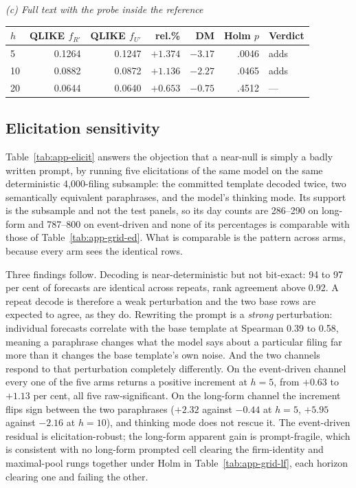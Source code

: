\begin{table}[htbp]
\vspace{1.2ex}
\emph{(c) Full text with the probe inside the reference}\\[0.4ex]
\begin{tabular}{@{}lrrrrrl@{}}
\toprule
$h$ & QLIKE $f_{R'}$ & QLIKE $f_{U'}$ & rel.\% & DM & Holm $p$ & Verdict \\
\midrule
 5 & 0.1264 & 0.1247 & $+1.374$ & $-3.17$ & .0046 & adds \\
10 & 0.0882 & 0.0872 & $+1.136$ & $-2.27$ & .0465 & adds \\
20 & 0.0644 & 0.0640 & $+0.653$ & $-0.75$ & .4512 & --- \\
\bottomrule
\end{tabular}
\end{table}

\subsection{Elicitation sensitivity}

Table~\ref{tab:app-elicit} answers the objection that a near-null is
simply a badly written prompt, by running five elicitations of the same
model on the same deterministic 4{,}000-filing subsample: the committed
template decoded twice, two semantically equivalent paraphrases, and the
model's thinking mode. Its support is the subsample and not the test
panels, so its day counts are 286--290 on long-form and 787--800 on
event-driven and none of its percentages is comparable with those of
Table~\ref{tab:app-grid-ed}. What is comparable is the pattern across arms,
because every arm sees the identical rows.

Three findings follow. Decoding is near-deterministic but not bit-exact:
94 to 97 per cent of forecasts are identical across repeats, rank agreement
above 0.92. A repeat decode is therefore a weak perturbation and the two base
rows are expected to agree, as they do. Rewriting the prompt is a
\emph{strong} perturbation: individual forecasts correlate with the base
template at Spearman 0.39 to 0.58, meaning a paraphrase changes what the
model says about a particular filing far more than it changes the base
template's own noise. And the two channels respond to that perturbation
completely differently. On the event-driven channel every one of the five
arms returns a positive increment at $h{=}5$, from $+0.63$ to $+1.13$ per
cent, all five raw-significant. On the long-form channel the increment
flips sign between the two paraphrases ($+2.32$ against $-0.44$ at
$h{=}5$, $+5.95$ against $-2.16$ at $h{=}10$), and thinking mode does not
rescue it. The event-driven residual is elicitation-robust; the long-form
apparent gain is prompt-fragile, which is consistent with no long-form
prompted cell clearing the firm-identity and maximal-pool rungs together under
Holm in Table~\ref{tab:app-grid-lf}, each horizon clearing one and failing the
other. %

